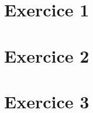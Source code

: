 \documentclass{article}
\begin{document}
	\maketitle
	\section{Exercice 1}
	
	\newpage
	\section{Exercice 2}
	
	\section{Exercice 3}
	
\end{document}
